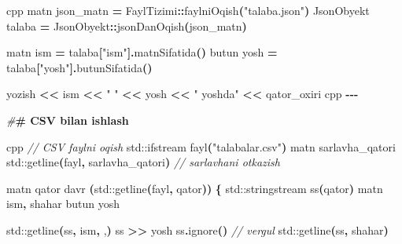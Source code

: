 \documentclass[a4paper,11pt,twoside,openright]{book}
\newenvironment{Shaded}{\begin{snugshade}}{\end{snugshade}}
\newcommand{\BuiltInTok}[1]{#1}
\newcommand{\CharTok}[1]{\textcolor[rgb]{0.31,0.60,0.02}{#1}}
\newcommand{\CommentTok}[1]{\textcolor[rgb]{0.56,0.35,0.01}{\textit{#1}}}
\newcommand{\ErrorTok}[1]{\textcolor[rgb]{0.64,0.00,0.00}{\textbf{#1}}}
\newcommand{\NormalTok}[1]{#1}
\newcommand{\OperatorTok}[1]{\textcolor[rgb]{0.81,0.36,0.00}{\textbf{#1}}}
\newcommand{\PreprocessorTok}[1]{\textcolor[rgb]{0.56,0.35,0.01}{\textit{#1}}}
\newcommand{\StringTok}[1]{\textcolor[rgb]{0.31,0.60,0.02}{#1}}
\begin{document}
\begin{Shaded}
\begin{Highlighting}[]
\ErrorTok{\textasciigrave{}\textasciigrave{}\textasciigrave{}}\NormalTok{cpp}
\NormalTok{matn json\_matn }\OperatorTok{=}\NormalTok{ FaylTizimi}\OperatorTok{::}\NormalTok{faylniOqish}\OperatorTok{(}\StringTok{"talaba.json"}\OperatorTok{)}
\NormalTok{JsonObyekt talaba }\OperatorTok{=}\NormalTok{ JsonObyekt}\OperatorTok{::}\NormalTok{jsonDanOqish}\OperatorTok{(}\NormalTok{json\_matn}\OperatorTok{)}

\NormalTok{matn ism }\OperatorTok{=}\NormalTok{ talaba}\OperatorTok{[}\StringTok{"ism"}\OperatorTok{].}\NormalTok{matnSifatida}\OperatorTok{()}
\NormalTok{butun yosh }\OperatorTok{=}\NormalTok{ talaba}\OperatorTok{[}\StringTok{"yosh"}\OperatorTok{].}\NormalTok{butunSifatida}\OperatorTok{()}

\NormalTok{yozish }\OperatorTok{\textless{}\textless{}}\NormalTok{ ism }\OperatorTok{\textless{}\textless{}} \StringTok{" "} \OperatorTok{\textless{}\textless{}}\NormalTok{ yosh }\OperatorTok{\textless{}\textless{}} \StringTok{" yoshda"} \OperatorTok{\textless{}\textless{}}\NormalTok{ qator\_oxiri}
\ErrorTok{\textasciigrave{}\textasciigrave{}\textasciigrave{}}\NormalTok{cpp}
\OperatorTok{{-}{-}{-}}

\PreprocessorTok{\#}\ErrorTok{\# CSV bilan ishlash}

\ErrorTok{\textasciigrave{}\textasciigrave{}\textasciigrave{}}\NormalTok{cpp}
\CommentTok{// CSV faylni o\textquotesingle{}qish}
\BuiltInTok{std::}\NormalTok{ifstream fayl}\OperatorTok{(}\StringTok{"talabalar.csv"}\OperatorTok{)}
\NormalTok{matn sarlavha\_qatori}
\BuiltInTok{std::}\NormalTok{getline}\OperatorTok{(}\NormalTok{fayl}\OperatorTok{,}\NormalTok{ sarlavha\_qatori}\OperatorTok{)}   \CommentTok{// sarlavhani o\textquotesingle{}tkazish}

\NormalTok{matn qator}
\NormalTok{davr }\OperatorTok{(}\BuiltInTok{std::}\NormalTok{getline}\OperatorTok{(}\NormalTok{fayl}\OperatorTok{,}\NormalTok{ qator}\OperatorTok{))} \OperatorTok{\{}
    \BuiltInTok{std::}\NormalTok{stringstream ss}\OperatorTok{(}\NormalTok{qator}\OperatorTok{)}
\NormalTok{    matn ism}\OperatorTok{,}\NormalTok{ shahar}
\NormalTok{    butun yosh}

    \BuiltInTok{std::}\NormalTok{getline}\OperatorTok{(}\NormalTok{ss}\OperatorTok{,}\NormalTok{ ism}\OperatorTok{,} \CharTok{\textquotesingle{},\textquotesingle{}}\OperatorTok{)}
\NormalTok{    ss }\OperatorTok{\textgreater{}\textgreater{}}\NormalTok{ yosh}
\NormalTok{    ss}\OperatorTok{.}\NormalTok{ignore}\OperatorTok{()}   \CommentTok{// vergul}
    \BuiltInTok{std::}\NormalTok{getline}\OperatorTok{(}\NormalTok{ss}\OperatorTok{,}\NormalTok{ shahar}\OperatorTok{)}


\end{Highlighting}
\end{Shaded}
\end{document}

